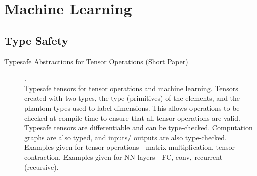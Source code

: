 \chapter {Machine Learning}

\section {Type Safety}

\begin{description}
    \item[\href{https://arxiv.org/abs/1710.06892}{Typesafe Abstractions for Tensor Operations (Short Paper)}] {\cite{chen2017typesafe}.
          \\ Typesafe tensors for tensor operations and machine learning. Tensors created with two types, the type (primitives) of the elements, and the phantom types used to label dimensions. This allows operations to be checked at compile time to ensure that all tensor operations are valid. Typesafe tensors are differentiable and can be type-checked. Computation graphs are also typed, and inputs/ outputs are also type-checked. Examples given for tensor operations - matrix multiplication, tensor contraction. Examples given for NN layers - FC, conv, recurrent (recursive).}
\end{description}
